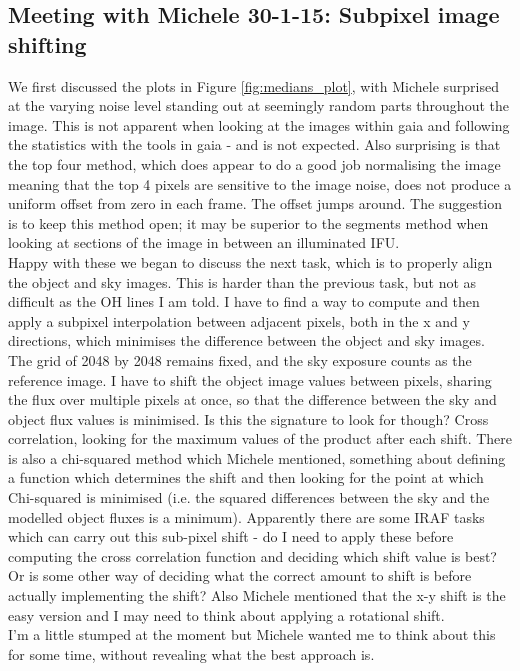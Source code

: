 \documentclass{literature}
\begin{document}
\subsection{Meeting with Michele 30-1-15: Subpixel image shifting}
We first discussed the plots in Figure \ref{fig:medians_plot}, with Michele surprised at the varying noise level standing out at seemingly random parts throughout the image. This is not apparent when looking at the images within gaia and following the statistics with the tools in gaia - and is not expected. Also surprising is that the top four method, which does appear to do a good job normalising the image meaning that the top 4 pixels are sensitive to the image noise, does not produce a uniform offset from zero in each frame. The offset jumps around. The suggestion is to keep this method open; it may be superior to the segments method when looking at sections of the image in between an illuminated IFU. \\ 
Happy with these we began to discuss the next task, which is to properly align the object and sky images. This is harder than the previous task, but not as difficult as the OH lines I am told. I have to find a way to compute and then apply a subpixel interpolation between adjacent pixels, both in the x and y directions, which minimises the difference between the object and sky images. The grid of 2048 by 2048 remains fixed, and the sky exposure counts as the reference image. I have to shift the object image values between pixels, sharing the flux over multiple pixels at once, so that the difference between the sky and object flux values is minimised. Is this the signature to look for though? Cross correlation, looking for the maximum values of the product after each shift. There is also a chi-squared method which Michele mentioned, something about defining a function which determines the shift and then looking for the point at which Chi-squared is minimised (i.e. the squared differences between the sky and the modelled object fluxes is a minimum). Apparently there are some IRAF tasks which can carry out this sub-pixel shift - do I need to apply these before computing the cross correlation function and deciding which shift value is best? Or is some other way of deciding what the correct amount to shift is before actually implementing the shift? Also Michele mentioned that the x-y shift is the easy version and I may need to think about applying a rotational shift. \\ 
I'm a little stumped at the moment but Michele wanted me to think about this for some time, without revealing what the best approach is. 
\end{document}
